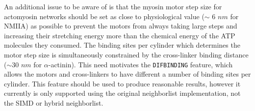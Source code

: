 \documentclass[11pt, oneside]{article}   	%
\begin{document}
 
An additional issue to be aware of is that the myosin motor step size for actomyosin networks should be set as close to physiological value ($\sim$ 6 $nm$ for NMIIA) as possible to prevent the motors from always taking large steps and increasing their stretching energy more than the chemical energy of the ATP molecules they consumed.  The binding sites per cylinder which determines the motor step size is simultaneously constrained by the cross-linker binding distance ($\sim$30 $nm$ for $\alpha$-actinin).  This need motivates the \texttt{DIFBINDING} feature, which allows the motors and cross-linkers to have different a number of binding sites per cylinder.  This feature should be used to produce reasonable results, however it currently is only supported using the original neighborlist implementation, not the SIMD or hybrid neighborlist.    

  
		
\end{document}
